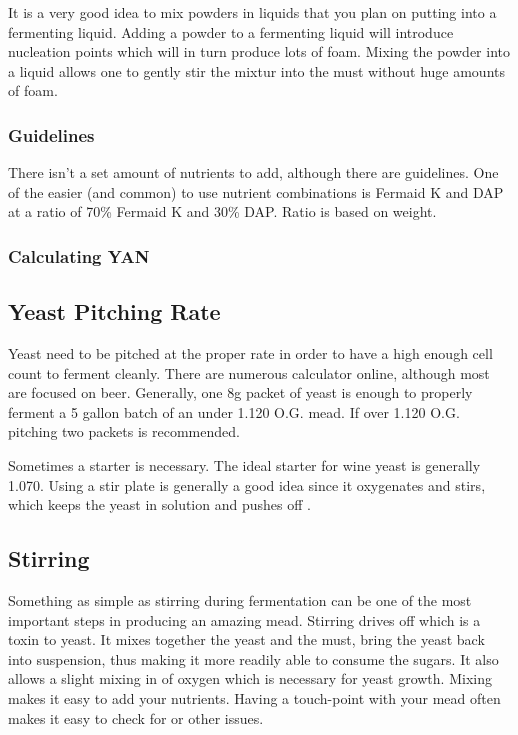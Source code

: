 \documentclass{article}
\begin{document}
  It is a very good idea to mix powders in liquids that you plan on putting into a fermenting liquid. Adding a powder to a fermenting liquid will introduce nucleation
  points which will in turn produce lots of foam. Mixing the powder into a liquid allows one to gently stir the mixtur into the must without huge amounts of foam.
  \subsubsection{Guidelines}
   There isn't a set amount of nutrients to add, although there are guidelines. One of the easier (and common) to use nutrient 
   combinations is Fermaid K and DAP at a ratio of 70\% Fermaid K and 30\% DAP\cite{gotmead-fermaid-ratio}. Ratio is based on weight. 

  \subsubsection{Calculating YAN}

 \subsection{Yeast Pitching Rate}
  Yeast need to be pitched at the proper rate in order to have a high enough cell count to ferment cleanly. There are numerous calculator online, although most
  are focused on beer. Generally, one 8g packet of yeast is enough to properly ferment a 5 gallon batch of an under 1.120 O.G. mead. If over 1.120 O.G. pitching
  two packets is recommended. 

  Sometimes a starter is necessary. The ideal starter for wine yeast is generally 1.070. Using a stir plate is generally a good idea since it oxygenates and stirs,
  which keeps the yeast in solution and pushes off .

 \subsection{Stirring}
  Something as simple as stirring during fermentation can be one of the most important steps in producing an amazing mead. Stirring drives off  which is a 
  toxin to yeast. It mixes together the yeast and the must, bring the yeast back into suspension, thus making it more readily able to consume the sugars. It also
  allows a slight mixing in of oxygen which is necessary for yeast growth. Mixing makes it easy to add your nutrients. Having a touch-point with your mead often
  makes it easy to check for  or other issues.
\end{document}
